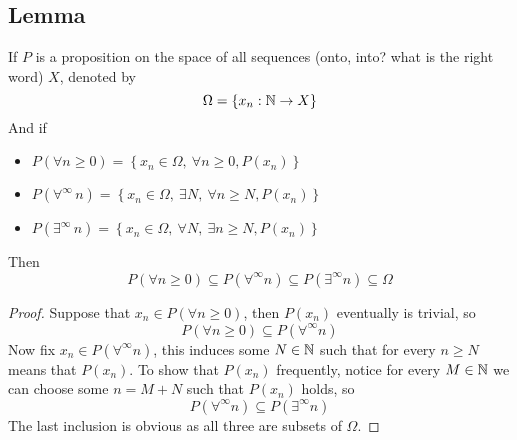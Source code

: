 \documentclass[../../main.tex]{subfiles}
\begin{document}
\providecommand{\pone}{P(\forall n\geq 0)}
\providecommand{\ptwo}{P(\forall^\infty n)}
\providecommand{\pthree}{P(\exists^\infty n)}
\subsection{Lemma}
\begin{lemma}\label{lemma:sequence hierarchy}
If $P$ is a proposition on the space of all sequences (onto, into? what is the right word) $X$, denoted by
\[
\Omega = \{x_n:\mathbb{N}\to X\}
\]
And if
\begin{itemize}
    \item $P(\forall n\geq 0) = \left\{x_n\in\Omega,\: \forall n\geq 0, P(x_n)  \right\}$
    \item $P(\forall^\infty\, n) = \left\{x_n\in\Omega,\: \exists N,\:\forall n\geq N, P(x_n)  \right\}$
    \item $P(\exists^\infty\, n) = \left\{x_n\in\Omega,\: \forall N,\:\exists n\geq N, P(x_n)  \right\}$
\end{itemize}


Then
\[
P(\forall n\geq 0)\subseteq P(\forall^\infty n)\subseteq P(\exists^\infty n)\subseteq \Omega
\]
\end{lemma}
\begin{proof}
    Suppose that $x_n\in \pone$, then $P(x_n)$ eventually is trivial, so 
    \[
    \pone\subseteq\ptwo
    \]
    Now fix $x_n\in\ptwo$, this induces some $N\in\mathbb{N}$ such that for every $n\geq N$ means that $P(x_n)$. To show that $P(x_n)$ frequently, notice for every $M\in\mathbb{N}$ we can choose some $n = M + N$ such that $P(x_n)$ holds, so
    \[
    \ptwo\subseteq\pthree
    \]
    The last inclusion is obvious as all three are subsets of $\Omega$.
\end{proof}
\end{document}
